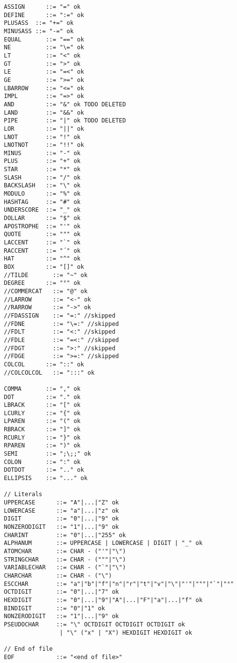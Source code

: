 \begin{lstlisting}[label={lst:newOzLexical},language=ebnf]
ASSIGN      ::= "=" ok
DEFINE      ::= ":=" ok
PLUSASS  ::= "+=" ok
MINUSASS ::= "-=" ok
EQUAL       ::= "==" ok
NE          ::= "\=" ok
LT          ::= "<" ok
GT          ::= ">" ok
LE          ::= "=<" ok
GE          ::= ">=" ok
LBARROW     ::= "<=" ok
IMPL        ::= "=>" ok
AND         ::= "&" ok TODO DELETED
LAND        ::= "&&" ok
PIPE        ::= "|" ok TODO DELETED
LOR         ::= "||" ok
LNOT        ::= "!" ok
LNOTNOT     ::= "!!" ok
MINUS       ::= "-" ok
PLUS        ::= "+" ok
STAR        ::= "*" ok
SLASH       ::= "/" ok
BACKSLASH   ::= "\" ok
MODULO      ::= "%" ok
HASHTAG     ::= "#" ok
UNDERSCORE  ::= "_" ok
DOLLAR      ::= "$" ok
APOSTROPHE  ::= "'" ok
QUOTE       ::= """ ok
LACCENT     ::= "`" ok
RACCENT     ::= "´" ok
HAT         ::= "^" ok
BOX         ::= "[]" ok
//TILDE       ::= "~" ok
DEGREE      ::= "°" ok
//COMMERCAT   ::= "@" ok
//LARROW      ::= "<-" ok
//RARROW      ::= "->" ok
//FDASSIGN    ::= "=:" //skipped
//FDNE        ::= "\=:" //skipped
//FDLT        ::= "<:" //skipped
//FDLE        ::= "=<:" //skipped
//FDGT        ::= ">:" //skipped
//FDGE        ::= ">=:" //skipped
COLCOL      ::= "::" ok
//COLCOLCOL   ::= ":::" ok

COMMA       ::= "," ok
DOT         ::= "." ok
LBRACK      ::= "[" ok
LCURLY      ::= "{" ok
LPAREN      ::= "(" ok
RBRACK      ::= "]" ok
RCURLY      ::= "}" ok
RPAREN      ::= ")" ok
SEMI        ::= ";\;;" ok
COLON       ::= ":" ok
DOTDOT      ::= ".." ok
ELLIPSIS    ::= "..." ok

// Literals
UPPERCASE      ::= "A"|...|"Z" ok
LOWERCASE      ::= "a"|...|"z" ok
DIGIT          ::= "0"|...|"9" ok
NONZERODIGIT   ::= "1"|...|"9" ok
CHARINT        ::= "0"|...|"255" ok
ALPHANUM       ::= UPPERCASE | LOWERCASE | DIGIT | "_" ok
ATOMCHAR       ::= CHAR - ("'"|"\")
STRINGCHAR     ::= CHAR - ("""|"\")
VARIABLECHAR   ::= CHAR - ("`"|"\")
CHARCHAR       ::= CHAR - ("\")
ESCCHAR        ::= "a"|"b"|"f"|"n"|"r"|"t"|"v"|"\"|"'"|"""|"`"|"°"
OCTDIGIT       ::= "0"|...|"7" ok
HEXDIGIT       ::= "0"|...|"9"|"A"|...|"F"|"a"|...|"f" ok
BINDIGIT       ::= "0"|"1" ok
NONZERODIGIT   ::= "1"|...|"9" ok
PSEUDOCHAR     ::= "\" OCTDIGIT OCTDIGIT OCTDIGIT ok
                | "\" ("x" | "X") HEXDIGIT HEXDIGIT ok

// End of file
EOF            ::= "<end of file>"

\end{lstlisting}